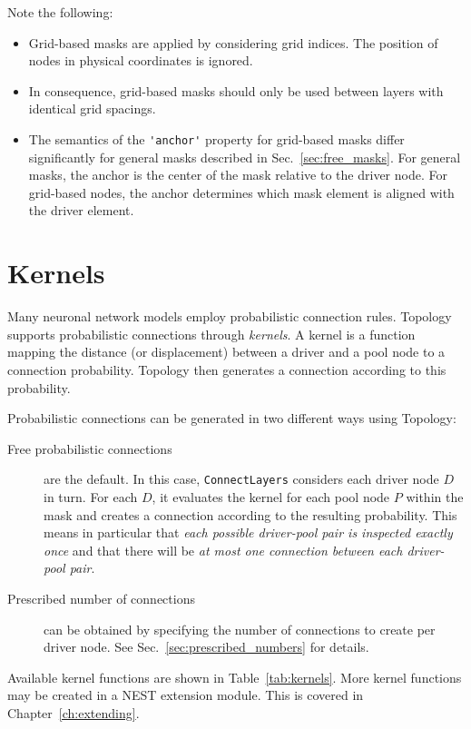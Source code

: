 \documentclass[a4paper,12pt]{report}
\begin{document}
Note the following:
\begin{itemize}
\item Grid-based masks are applied by considering grid indices. The
  position of nodes in physical coordinates is ignored.
\item In consequence, grid-based masks should only be used between
  layers with identical grid spacings.
\item The semantics of the \lstinline!'anchor'! property for
grid-based masks differ
significantly for general masks described in
Sec.~\ref{sec:free_masks}. For general masks, the anchor is the center
of the mask relative to the driver node. For grid-based nodes, the
anchor determines which mask element is aligned with the driver element.
\end{itemize}


\section{Kernels}\label{sec:conn_kernels}

Many neuronal network models employ probabilistic connection
rules. Topology supports
probabilistic connections through \emph{kernels}. A
kernel is a function mapping the distance (or displacement) between a
driver and a pool node to a connection probability. Topology then
generates a connection according to this probability.

Probabilistic connections can be generated in two different ways using
Topology:
\begin{description}
\item[Free probabilistic connections] are the default.
  In this case, \lstinline!ConnectLayers! considers each driver node $D$
  in turn. For each $D$, it evaluates the kernel for each
  pool node $P$ within the mask and creates a connection according to
  the resulting probability. This means in particular that \emph{each
    possible driver-pool pair is inspected exactly once} and that
  there will be \emph{at most one connection between each driver-pool pair}.
\item[Prescribed number of connections] can be obtained by specifying
  the number of connections to create per driver node. See
  Sec.~\ref{sec:prescribed_numbers} for details.
\end{description}

Available kernel functions are shown in Table~\ref{tab:kernels}. More
kernel functions may be created in a NEST extension module. This is covered
in Chapter~\ref{ch:extending}.
\end{document}
